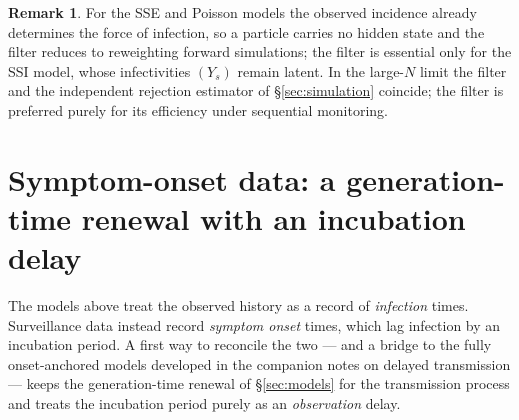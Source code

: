 \documentclass{article}
\theoremstyle{definition}
\newtheorem*{remark}{Remark}
\begin{document}
\begin{remark}
  For the SSE and Poisson models the observed incidence already determines the
  force of infection, so a particle carries no hidden state and the filter
  reduces to reweighting forward simulations; the filter is essential only for
  the SSI model, whose infectivities $(Y_s)$ remain latent.  In the large-$N$
  limit the filter and the independent rejection estimator of
  \S\ref{sec:simulation} coincide; the filter is preferred purely for its
  efficiency under sequential monitoring.
\end{remark}

\section{Symptom-onset data: a generation-time renewal with an incubation delay}
\label{sec:bridge}

The models above treat the observed history as a record of \emph{infection}
times.  Surveillance data instead record \emph{symptom onset} times, which lag
infection by an incubation period.  A first way to reconcile the two --- and a
bridge to the fully onset-anchored models developed in the companion notes on
delayed transmission --- keeps the generation-time renewal of \S\ref{sec:models}
for the transmission process and treats the incubation period purely as an
\emph{observation} delay.
\end{document}
